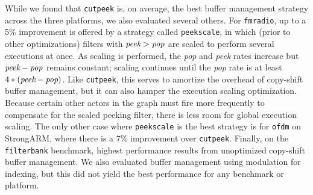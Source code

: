 While we found that {\tt cutpeek} is, on average, the best buffer
management strategy across the three platforms, we also evaluated
several others.  For {\tt fmradio}, up to a 5\% improvement is offered
by a strategy called {\tt peekscale}, in which (prior to other
optimizations) filters with $\mbox{\it peek}>\mbox{\it pop}$ are
scaled to perform several executions at once.  As scaling is
performed, the {\it pop} and {\it peek} rates increase but $\mbox{{\it
peek}} - \mbox{\it pop}$ remains constant; scaling continues until the
{\it pop} rate is at least $4*(\mbox{{\it peek}} - \mbox{{\it pop}})$.
Like {\tt cutpeek}, this serves to amortize the overhead of copy-shift
buffer management, but it can also hamper the execution scaling
optimization.  Because certain other actors in the graph must fire
more frequently to compensate for the scaled peeking filter, there is
less room for global execution scaling.  The only other case where
{\tt peekscale} is the best strategy is for {\tt ofdm} on StrongARM,
where there is a 7\% improvement over {\tt cutpeek}.  Finally, on the
{\tt filterbank} benchmark, highest performance results from
unoptimized copy-shift buffer management.  We also evaluated buffer
management using modulation for indexing, but this did not yield the
best performance for any benchmark or platform.
